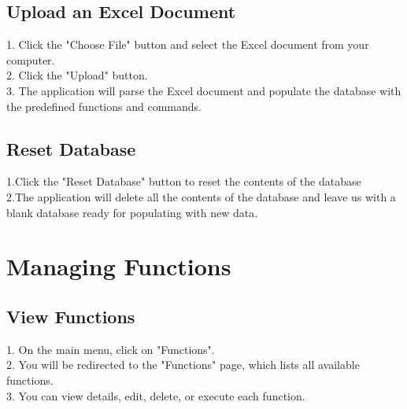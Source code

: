 \documentclass[12pt,a4paper]{scrbook}
\begin{document}
	\subsection{Upload an Excel Document}
	1. Click the "Choose File" button and select the Excel document from your computer.\\
	2. Click the "Upload" button.\\
	3. The application will parse the Excel document and populate the database with the predefined functions and commands.\\
	\subsection{Reset Database}
	1.Click the "Reset Database" button  to reset the contents of the database\\
	2.The application will delete all the contents of the database and leave us with a blank database ready for populating with new data.
	\section{Managing Functions}
	
	\subsection{View Functions}
	1. On the main menu, click on "Functions".\\
	2. You will be redirected to the "Functions" page, which lists all available functions.\\
	3. You can view details, edit, delete, or execute each function.\\
	
\end{document}
